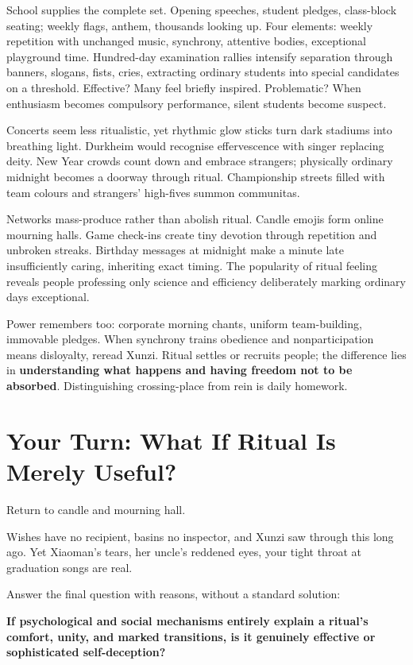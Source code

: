 School supplies the complete set. Opening speeches, student pledges, class-block seating; weekly flags, anthem, thousands looking up. Four elements: weekly repetition with unchanged music, synchrony, attentive bodies, exceptional playground time. Hundred-day examination rallies intensify separation through banners, slogans, fists, cries, extracting ordinary students into special candidates on a threshold. Effective? Many feel briefly inspired. Problematic? When enthusiasm becomes compulsory performance, silent students become suspect.

Concerts seem less ritualistic, yet rhythmic glow sticks turn dark stadiums into breathing light. Durkheim would recognise effervescence with singer replacing deity. New Year crowds count down and embrace strangers; physically ordinary midnight becomes a doorway through ritual. Championship streets filled with team colours and strangers' high-fives summon communitas.

Networks mass-produce rather than abolish ritual. Candle emojis form online mourning halls. Game check-ins create tiny devotion through repetition and unbroken streaks. Birthday messages at midnight make a minute late insufficiently caring, inheriting exact timing. The popularity of ritual feeling reveals people professing only science and efficiency deliberately marking ordinary days exceptional.

Power remembers too: corporate morning chants, uniform team-building, immovable pledges. When synchrony trains obedience and nonparticipation means disloyalty, reread Xunzi. Ritual settles or recruits people; the difference lies in \textbf{understanding what happens and having freedom not to be absorbed}. Distinguishing crossing-place from rein is daily homework.

\section[Your Turn: If Ritual Is Only Useful]{Your Turn: What If Ritual Is Merely Useful?}
Return to candle and mourning hall.

Wishes have no recipient, basins no inspector, and Xunzi saw through this long ago. Yet Xiaoman's tears, her uncle's reddened eyes, your tight throat at graduation songs are real.

Answer the final question with reasons, without a standard solution:

\textbf{If psychological and social mechanisms entirely explain a ritual's comfort, unity, and marked transitions, is it genuinely effective or sophisticated self-deception?}

